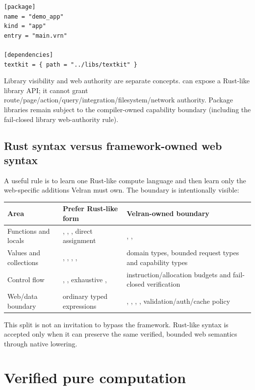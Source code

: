 \begin{lstlisting}
[package]
name = "demo_app"
kind = "app"
entry = "main.vrn"

[dependencies]
textkit = { path = "../libs/textkit" }
\end{lstlisting}

Library visibility and web authority are separate concepts.  can expose a Rust-like library API; it cannot grant route/page/action/query/integration/filesystem/network authority. Package libraries remain subject to the compiler-owned capability boundary (including the fail-closed library web-authority rule).

\subsection*{Rust syntax versus framework-owned web syntax}

A useful rule is to learn one Rust-like compute language and then learn only the web-specific additions Velran must own. The boundary is intentionally visible:

\begin{center}
\begin{tabularx}{\textwidth}{@{}L{0.30\textwidth}YY@{}}
\toprule
Area & Prefer Rust-like form & Velran-owned boundary \\
\midrule
Functions and locals & , , , direct assignment & , ,  \\
Values and collections & , , , ,  & domain types, bounded request types and capability types \\
Control flow & , , exhaustive ,  & instruction/allocation budgets and fail-closed verification \\
Web/data boundary & ordinary typed expressions & , , , , validation/auth/cache policy \\
\bottomrule
\end{tabularx}
\end{center}

This split is not an invitation to bypass the framework. Rust-like syntax is accepted only when it can preserve the same verified, bounded web semantics through native lowering.


\section{Verified pure computation}

